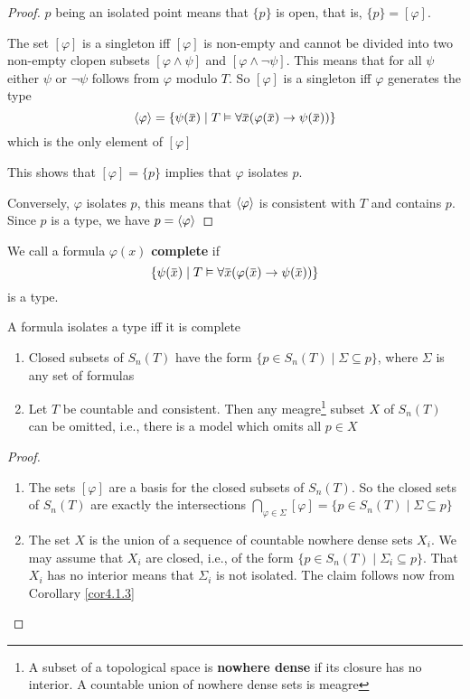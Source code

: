\documentclass[11pt]{article}
\begin{document}
\begin{proof}
\(p\) being an isolated point means that \(\{p\}\) is open, that is, \(\{p\}=[\varphi]\).

The set \([\varphi]\) is a singleton iff \([\varphi]\) is non-empty and cannot be
  divided into two non-empty clopen subsets \([\varphi\wedge\psi]\) and
  \([\varphi\wedge\neg\psi]\). This means that for all \(\psi\) either \(\psi\) or
  \(\neg\psi\) follows from \(\varphi\) modulo \(T\). So \([\varphi]\) is a singleton iff \(\varphi\)
  generates the type
\begin{equation*}
\la\varphi\ra=\{\psi(\bbar{x})\mid T\vDash\forall\bbar{x}(\varphi(\bbar{x})\to\psi(\bbar{x}))\}
\end{equation*}
which is the only element of \([\varphi]\)

This shows that \([\varphi]=\{p\}\) implies that \(\varphi\) isolates \(p\).

Conversely, \(\varphi\) isolates \(p\), this means that \(\langle\varphi\rangle\) is consistent with \(T\) and
contains \(p\). Since \(p\) is a type, we have \(p=\langle\varphi\rangle\)
\end{proof}

We call a formula \(\varphi(x)\) \textbf{complete} if
\begin{equation*}
\{\psi(\bbar{x})\mid T\vDash\forall\bbar{x}(\varphi(\bbar{x})\to\psi(\bbar{x}))\}
\end{equation*}
is a type.
\begin{corollary}[]
\label{cor4.2.7}
A formula isolates a type iff it is complete
\end{corollary}

\begin{exercise}
\label{ex4.2.2}
\begin{enumerate}
\item Closed subsets of \(S_n(T)\) have the form
\(\{p\in S_n(T)\mid\Sigma\subseteq p\}\), where \(\Sigma\) is any set of formulas
\item Let \(T\) be countable and consistent. Then any meagre\footnote{A subset of a topological space is \textbf{nowhere dense} if its closure has no interior. A countable union of nowhere dense sets is meagre} subset \(X\)
of \(S_n(T)\) can be omitted, i.e., there is a model which omits all
\(p\in X\)
\end{enumerate}
\end{exercise}

\begin{proof}
\begin{enumerate}
\item The sets \([\varphi]\) are a basis for the closed subsets of \(S_n(T)\). So the
closed sets of \(S_n(T)\) are exactly the intersections
\(\bigcap_{\varphi\in\Sigma}[\varphi]=\{p\in S_n(T)\mid\Sigma\subseteq p\}\)
\item The set \(X\) is the union of a sequence of countable nowhere dense sets
\(X_i\). We may assume that \(X_i\) are closed, i.e., of the form
\(\{p\in S_n(T)\mid \Sigma_i\subseteq p\}\). That \(X_i\) has no interior means
that \(\Sigma_i\) is not isolated. The claim follows now from Corollary \ref{cor4.1.3}
\end{enumerate}
\end{proof}
\end{document}
